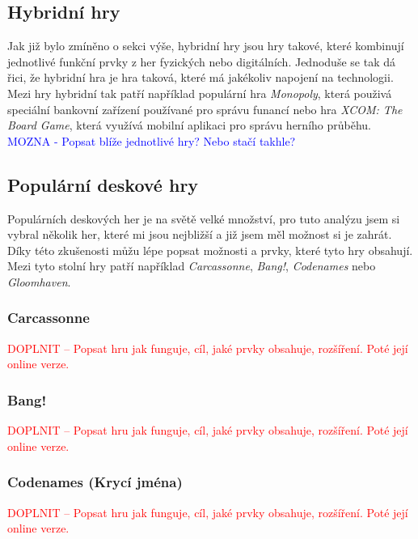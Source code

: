 \subsection*{Hybridní hry}
\label{subsec:popular-board-games-analysis-hybrid-games}
Jak již bylo zmíněno o sekci výše, hybridní hry jsou hry takové, které kombinují jednotlivé funkční prvky z her fyzických nebo digitálních. Jednoduše se tak dá řici, že hybridní hra je hra taková, které má jakékoliv napojení na technologii. Mezi hry hybridní tak patří například populární hra \textit{Monopoly}, která použivá speciální bankovní zařízení používané pro správu funancí nebo hra \textit{XCOM: The Board Game}, která využívá mobilní aplikaci pro správu herního průběhu.
\textcolor{blue}{MOZNA - Popsat blíže jednotlivé hry? Nebo stačí takhle?}

\subsection{Populární deskové hry}
\label{subsec:popular-board-games-analysis-popular-games}
Populárních deskových her je na světě velké množství, pro tuto analýzu jsem si vybral několik her, které mi jsou nejbližší a již jsem měl možnost si je zahrát. Díky této zkušenosti můžu lépe popsat možnosti a prvky, které tyto hry obsahují. Mezi tyto stolní hry patří například \textit{Carcassonne}, \textit{Bang!}, \textit{Codenames} nebo \textit{Gloomhaven}.

\subsubsection{Carcassonne}
\label{subsubsec:popular-board-games-analysis-carcassonne}
\textcolor{red}{DOPLNIT -- Popsat hru jak funguje, cíl, jaké prvky obsahuje, rozšíření. Poté její online verze.}

\subsubsection{Bang!}
\label{subsubsec:popular-board-games-analysis-bang}
\textcolor{red}{DOPLNIT -- Popsat hru jak funguje, cíl, jaké prvky obsahuje, rozšíření. Poté její online verze.}

\subsubsection{Codenames (Krycí jména)}
\label{subsubsec:popular-board-games-analysis-codenames}
\textcolor{red}{DOPLNIT -- Popsat hru jak funguje, cíl, jaké prvky obsahuje, rozšíření. Poté její online verze.}

